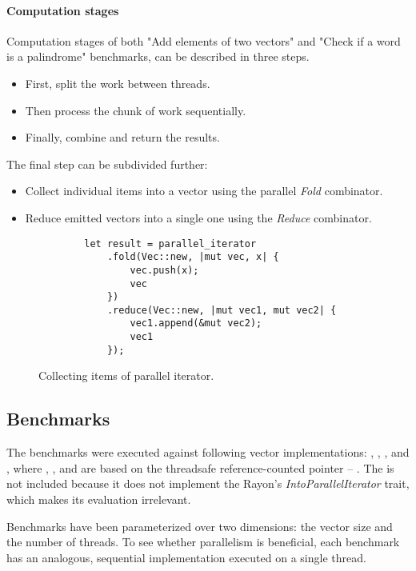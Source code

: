 \paragraph*{Computation stages}
Computation stages of both "Add elements of two vectors" and "Check if a word is a palindrome" benchmarks, can be described in three steps.
\begin{itemize}
    \item First, split the work between threads.
    \item Then process the chunk of work sequentially.
    \item Finally, combine and return the results.
\end{itemize}

The final step can be subdivided further:
\begin{itemize}
    \item Collect individual items into a vector using the parallel \emph{Fold} combinator.
    \item Reduce emitted vectors into a single one using the \emph{Reduce} combinator.
\end{itemize}

\begin{figure}[!htbp]
    \centering

    \begin{verbatim}
        let result = parallel_iterator
            .fold(Vec::new, |mut vec, x| {
                vec.push(x);
                vec
            })
            .reduce(Vec::new, |mut vec1, mut vec2| {
                vec1.append(&mut vec2);
                vec1
            });
    \end{verbatim}

    \caption{Collecting items of parallel iterator.}
    \label{fig:fold-reduce}
\end{figure}

\subsection{Benchmarks}
\label{sec:par-benchmarks}
The benchmarks were executed against following vector implementations: \stdvec{}, \rbvec{}, \rrbvec{}, and \pvec{}, where \rbvec{}, \rrbvec{}, and \pvec{} are based on the threadsafe reference-counted pointer -- \arc{}. The \imrsvec{} is not included because it does not implement the Rayon's \emph{IntoParallelIterator} trait, which makes its evaluation irrelevant.

Benchmarks have been parameterized over two dimensions: the vector size and the number of threads. To see whether parallelism is beneficial, each benchmark has an analogous, sequential implementation executed on a single thread.

